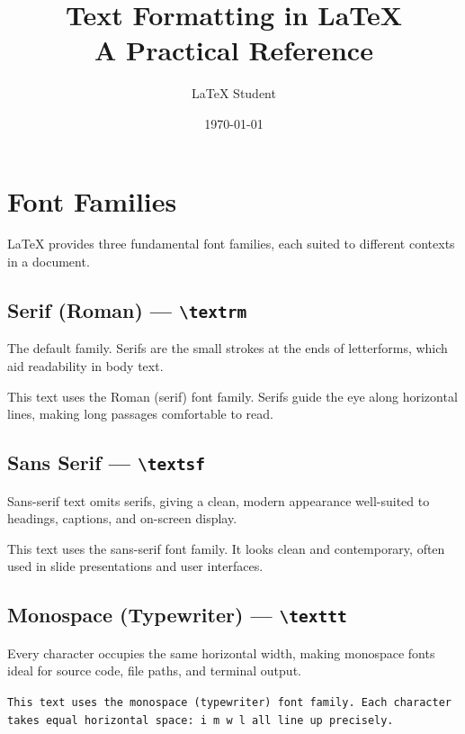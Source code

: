 \documentclass[12pt,a4paper]{article}
\title{\textbf{Text Formatting in \LaTeX}\\[0.5em]
       \large A Practical Reference}
\author{LaTeX Student}
\date{\today}
\begin{document}
\maketitle
\tableofcontents
\newpage


\section{Font Families}
\label{sec:families}

\LaTeX{} provides three fundamental font families, each suited to different
contexts in a document.

\subsection{Serif (Roman) — \texttt{\textbackslash textrm}}

The default family. Serifs are the small strokes at the ends of letterforms,
which aid readability in body text.

\textrm{This text uses the Roman (serif) font family. Serifs guide the eye
along horizontal lines, making long passages comfortable to read.}

\subsection{Sans Serif — \texttt{\textbackslash textsf}}

Sans-serif text omits serifs, giving a clean, modern appearance well-suited
to headings, captions, and on-screen display.

\textsf{This text uses the sans-serif font family. It looks clean and
contemporary, often used in slide presentations and user interfaces.}

\subsection{Monospace (Typewriter) — \texttt{\textbackslash texttt}}

Every character occupies the same horizontal width, making monospace fonts
ideal for source code, file paths, and terminal output.

\texttt{This text uses the monospace (typewriter) font family. Each character
takes equal horizontal space: i m w l all line up precisely.}
\end{document}
